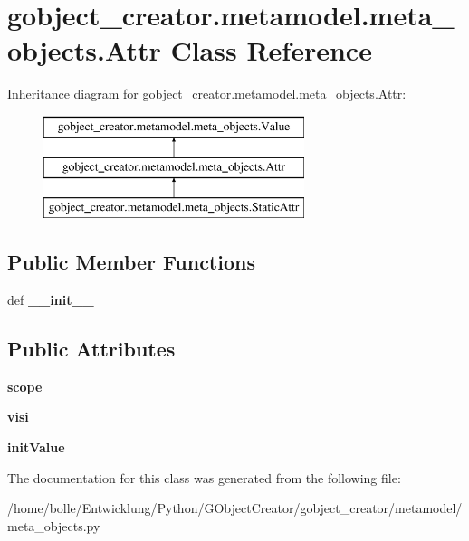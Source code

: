 \hypertarget{classgobject__creator_1_1metamodel_1_1meta__objects_1_1Attr}{
\section{gobject\_\-creator.metamodel.meta\_\-objects.Attr Class Reference}
\label{classgobject__creator_1_1metamodel_1_1meta__objects_1_1Attr}
}
Inheritance diagram for gobject\_\-creator.metamodel.meta\_\-objects.Attr:\begin{figure}[H]
\begin{center}
\leavevmode
\includegraphics[height=3cm]{classgobject__creator_1_1metamodel_1_1meta__objects_1_1Attr}
\end{center}
\end{figure}
\subsection*{Public Member Functions}
\begin{DoxyCompactItemize}
\item 
\hypertarget{classgobject__creator_1_1metamodel_1_1meta__objects_1_1Attr_a9bbc2a50dfeb6b7100821b921ab061fa}{
def {\bfseries \_\-\_\-init\_\-\_\-}}
\label{classgobject__creator_1_1metamodel_1_1meta__objects_1_1Attr_a9bbc2a50dfeb6b7100821b921ab061fa}

\end{DoxyCompactItemize}
\subsection*{Public Attributes}
\begin{DoxyCompactItemize}
\item 
\hypertarget{classgobject__creator_1_1metamodel_1_1meta__objects_1_1Attr_a192465b3993d1c5a8cb786d3a11ad6d5}{
{\bfseries scope}}
\label{classgobject__creator_1_1metamodel_1_1meta__objects_1_1Attr_a192465b3993d1c5a8cb786d3a11ad6d5}

\item 
\hypertarget{classgobject__creator_1_1metamodel_1_1meta__objects_1_1Attr_ac94d3e00562ff6a0d94102c3f16aa1db}{
{\bfseries visi}}
\label{classgobject__creator_1_1metamodel_1_1meta__objects_1_1Attr_ac94d3e00562ff6a0d94102c3f16aa1db}

\item 
\hypertarget{classgobject__creator_1_1metamodel_1_1meta__objects_1_1Attr_a3b3dd6f551a76a1b5cb73791c5ea2190}{
{\bfseries initValue}}
\label{classgobject__creator_1_1metamodel_1_1meta__objects_1_1Attr_a3b3dd6f551a76a1b5cb73791c5ea2190}

\end{DoxyCompactItemize}


The documentation for this class was generated from the following file:\begin{DoxyCompactItemize}
\item 
/home/bolle/Entwicklung/Python/GObjectCreator/gobject\_\-creator/metamodel/meta\_\-objects.py\end{DoxyCompactItemize}
